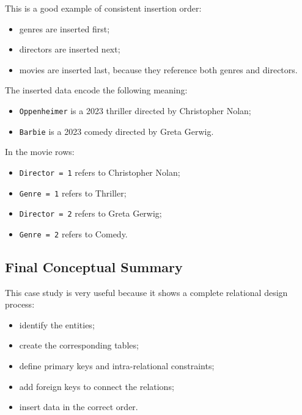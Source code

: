  This is a good example of consistent insertion order:
 \begin{itemize}
  \item genres are inserted first;
  \item directors are inserted next;
  \item movies are inserted last, because they reference both genres and directors.
 \end{itemize}

 \begin{example}
  The inserted data encode the following meaning:
  \begin{itemize}
   \item \texttt{Oppenheimer} is a 2023 thriller directed by Christopher Nolan;
   \vspace{0.2cm}
   \item \texttt{Barbie} is a 2023 comedy directed by Greta Gerwig.
  \end{itemize}

  In the movie rows:
  \begin{itemize}
   \item \texttt{Director = 1} refers to Christopher Nolan;
   \vspace{0.2cm}
   \item \texttt{Genre = 1} refers to Thriller;
   \vspace{0.2cm}
   \item \texttt{Director = 2} refers to Greta Gerwig;
   \vspace{0.2cm}
   \item \texttt{Genre = 2} refers to Comedy.
  \end{itemize}
 \end{example}

 \subsection{Final Conceptual Summary}

 This case study is very useful because it shows a complete relational design process:
 \begin{itemize}
  \item identify the entities;
  \item create the corresponding tables;
  \item define primary keys and intra-relational constraints;
  \item add foreign keys to connect the relations;
  \item insert data in the correct order.
 \end{itemize}

